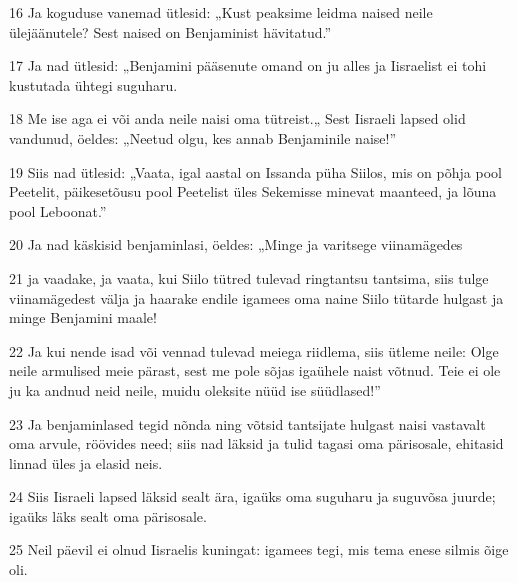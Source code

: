 \par 16 Ja koguduse vanemad ütlesid: „Kust peaksime leidma naised neile ülejäänutele? Sest naised on Benjaminist hävitatud.”
\par 17 Ja nad ütlesid: „Benjamini pääsenute omand on ju alles ja Iisraelist ei tohi kustutada ühtegi suguharu.
\par 18 Me ise aga ei või anda neile naisi oma tütreist.„ Sest Iisraeli lapsed olid vandunud, öeldes: „Neetud olgu, kes annab Benjaminile naise!”
\par 19 Siis nad ütlesid: „Vaata, igal aastal on Issanda püha Siilos, mis on põhja pool Peetelit, päikesetõusu pool Peetelist üles Sekemisse minevat maanteed, ja lõuna pool Leboonat.”
\par 20 Ja nad käskisid benjaminlasi, öeldes: „Minge ja varitsege viinamägedes
\par 21 ja vaadake, ja vaata, kui Siilo tütred tulevad ringtantsu tantsima, siis tulge viinamägedest välja ja haarake endile igamees oma naine Siilo tütarde hulgast ja minge Benjamini maale!
\par 22 Ja kui nende isad või vennad tulevad meiega riidlema, siis ütleme neile: Olge neile armulised meie pärast, sest me pole sõjas igaühele naist võtnud. Teie ei ole ju ka andnud neid neile, muidu oleksite nüüd ise süüdlased!”
\par 23 Ja benjaminlased tegid nõnda ning võtsid tantsijate hulgast naisi vastavalt oma arvule, röövides need; siis nad läksid ja tulid tagasi oma pärisosale, ehitasid linnad üles ja elasid neis.
\par 24 Siis Iisraeli lapsed läksid sealt ära, igaüks oma suguharu ja suguvõsa juurde; igaüks läks sealt oma pärisosale.
\par 25 Neil päevil ei olnud Iisraelis kuningat: igamees tegi, mis tema enese silmis õige oli.



